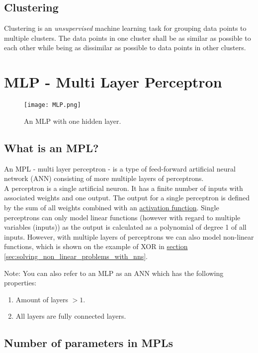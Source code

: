\subsection{Clustering}

Clustering is an \textit{unsupervised} machine learning task for grouping data points to multiple clusters. The data points in one cluster shall be as similar as possible to each other while being as dissimilar as possible to data points in other clusters.

\section{MLP - Multi Layer Perceptron}
\label{sec:mlp}

\begin{figure}[h]
    \centering
    \texttt{[image: MLP.png]}
    \caption{An MLP with one hidden layer.}
    \label{fig:mlp}
\end{figure}

\subsection{What is an MPL?}

An MPL - multi layer perceptron - is a type of feed-forward artificial neural network (ANN) consisting of more multiple layers of perceptrons.\\
A perceptron is a single artificial neuron. It has a finite number of inputs with associated weights and one output. The output for a single perceptron is defined by the sum of all weights combined with an \hyperref[sec:activation_functions]{activation function}. Single perceptrons can only model linear functions (however with regard to multiple variables (inputs)) as the output is calculated as a polynomial of degree 1 of all inputs. However, with multiple layers of perceptrons we can also model non-linear functions, which is shown on the example of XOR in \hyperref[sec:solving_non_linear_problems_with_nns]{section \ref*{sec:solving_non_linear_problems_with_nns}}.

Note: You can also refer to an MLP as an ANN which has the following properties:
\begin{enumerate}
    \item Amount of layers $> 1$.
    \item All layers are fully connected layers.
\end{enumerate}

\subsection{Number of parameters in MPLs}

